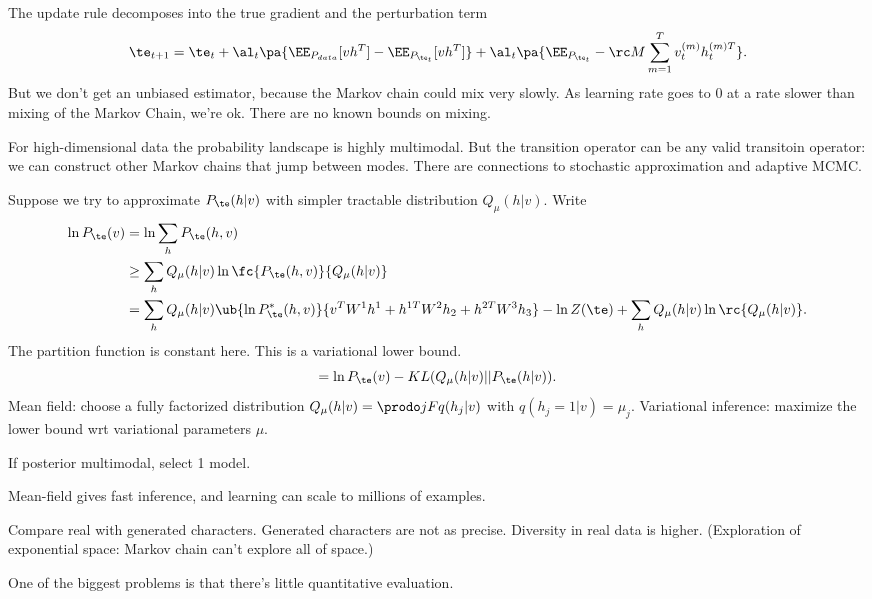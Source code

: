 The update rule decomposes into the true gradient and the perturbation term
$$
\te_{t+1}=
\te_t+\al_t\pa{\EE_{P_{data}} [vh^T] - \EE_{P_{\te_t}} [vh^T]} + \al_t \pa{\EE_{P_{\te_t}} - \rc M \sum_{m=1}^T v_t^{(m)}h_t^{(m)T}}.
$$
But we don't get an unbiased estimator, because the Markov chain could mix very slowly.
As learning rate goes to 0 at a rate slower than mixing of the Markov Chain, we're ok.
There are no known bounds on mixing.


For high-dimensional data the probability landscape is highly multimodal. But the transition operator can be any valid transitoin operator: we can construct other Markov chains that jump between modes. There are connections to stochastic approximation and adaptive MCMC.

Suppose we try to approximate $P_\te(h|v)$ with simpler tractable distribution $Q_\mu(h|v)$. Write
\begin{align}
\ln P_\te(v)& = \ln \sum_h P_\te(h,v) \\
&\ge \sum_h Q_\mu(h|v) \ln \fc{P_\te(h,v)}{Q_\mu(h|v)}\\
&=\sum_h Q_\mu(h|v)\ub{ \ln P_\te^*(h,v) }{v^TW^1h^1 + h^{1T}W^2h_2 + h^{2T}W^3 h_3}- \ln Z(\te) + \sum_h Q_\mu(h|v) \ln \rc{Q_\mu(h|v)}.
\end{align}
The partition function is constant here. 
This is a variational lower bound.
$$
=\ln P_\te(v) - KL (Q_\mu(h|v)||P_\te(h|v)).
$$
Mean field: choose a fully factorized distribution $Q_\mu(h|v) = \prodo jF q(h_j|v)$ with $q(h_j=1|v) = \mu_j$. Variational inference: maximize the lower bound wrt variational parameters $\mu$.

If posterior multimodal, select 1 model.

Mean-field gives fast inference, and learning can scale to millions of examples.


Compare real with generated characters. Generated characters are not as precise.
Diversity in real data is higher. (Exploration of exponential space: Markov chain can't explore all of space.)

One of the biggest problems is that there's little quantitative evaluation.

